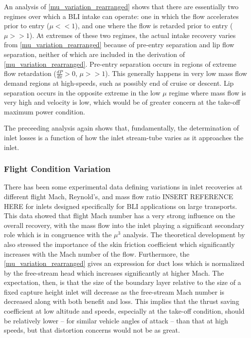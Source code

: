 				An analysis of \ref{mu_variation_rearranged} shows that there are essentially two regimes over which a BLI intake can operate:  one in which the flow accelerates prior to entry ($\mu << 1$), and one where the flow is retarded prior to entry ($\mu >> 1$).  At extremes of these two regimes, the actual intake recovery varies from \ref{mu_variation_rearranged} because of pre-entry separation and lip flow separation, neither of which are included in the derivation of \ref{mu_variation_rearranged}.  Pre-entry separation occurs in regions of extreme flow retardation ($\frac{dP}{dx} > 0$, $\mu >> 1$).  This generally happens in very low mass flow demand regions at high-speeds, such as possibly end of cruise or descent.  Lip separation occurs in the opposite extreme in the low $\mu$ regime where mass flow is very high and velocity is low, which would be of greater concern at the take-off maximum power condition.   
				
				The preceeding analysis again shows that, fundamentally, the determination of inlet losses is a function of how the inlet stream-tube varies as it approaches the inlet. 
	
			\subsubsection{Flight Condition Variation}
				There has been some experimental data defining variations in inlet recoveries at different flight Mach, Reynold's, and mass flow ratio INSERT REFERENCE HERE for inlets designed specifically for BLI applications on large transports.  This data showed that flight Mach number has a very strong influence on the overall recovery, with the mass flow into the inlet playing a significant secondary role which is in congruence with the $\mu^3$ analysis.  The theoretical development by \cite{Shedon1999} also stressed the importance of the skin friction coefficient which significantly increases with the Mach number of the flow.  Furthermore, the \ref{mu_variation_rearranged} gives an expression for duct loss which is normalized by the free-stream head which increases significantly at higher Mach.  The expectation, then, is that the size of the boundary layer relative to the size of a fixed capture height inlet will decrease as the free-stream Mach number is decreased along with both benefit and loss.  This implies that the thrust saving coefficient at low altitude and speeds, especially at the take-off condition, should be relatively lower -- for similar vehicle angles of attack -- than that at high speeds, but that distortion concerns would not be as great.  

